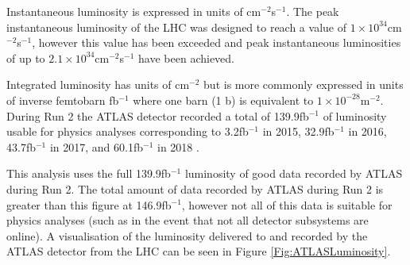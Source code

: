 \documentclass[12pt,a4paper,epsf,portrait,times,epsfig]{report}
\begin{document}
		Instantaneous luminosity is expressed in units of cm$^{-2}$s$^{-1}$. The peak instantaneous luminosity of the LHC was designed to reach a value of $1 \times 10^{34}$cm$^{-2}$s$^{-1}$, however this value has been exceeded and peak instantaneous luminosities of up to $2.1 \times 10^{34}$cm$^{-2}$s$^{-1}$ have been achieved. \par
		
		Integrated luminosity has units of cm$^{-2}$ but is more commonly expressed in units of inverse femtobarn fb$^{-1}$ where one barn (1 b) is equivalent to $1 \times 10^{-28} $m$^{-2}$. During Run 2 the ATLAS detector recorded a total of 139.9fb$^{-1}$ of luminosity usable for physics analyses corresponding to 3.2fb$^{-1}$ in 2015, 32.9fb$^{-1}$ in 2016, 43.7fb$^{-1}$ in 2017, and 60.1fb$^{-1}$ in 2018 \cite{ATLASLumiPublic}. \par
		
		This analysis uses the full 139.9fb$^{-1}$ luminosity of good data recorded by ATLAS during Run 2. The total amount of data recorded by ATLAS during Run 2 is greater than this figure at 146.9fb$^{-1}$, however not all of this data is suitable for physics analyses (such as in the event that not all detector subsystems are online). A visualisation of the luminosity delivered to and recorded by the ATLAS detector from the LHC can be seen in Figure \ref{Fig:ATLASLuminosity}.
\end{document}
